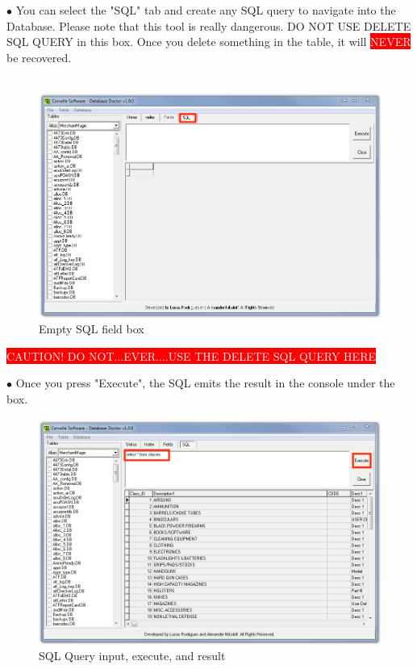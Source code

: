 \documentclass[a4paper, 11pt]{article}
\begin{document}
\vspace*{\fill}
$\bullet$ You can select the "SQL" tab and create any SQL query to navigate into the Database. Please note that this tool is really dangerous. DO NOT USE DELETE SQL QUERY in this box. Once you delete something in the table, it will \colorbox{Red}{\textcolor{White}{NEVER}} be recovered.\\ \\
\begin{figure}[h]
    \centering
     \includegraphics[width=\textwidth]{capture 43}
    \caption{Empty SQL field box}
\end{figure}
\vspace*{\fill}
\colorbox{Red}{\textcolor{White}{CAUTION! DO NOT...EVER....USE THE DELETE SQL QUERY HERE}} 
\pagebreak

\vspace*{\fill}
$\bullet$ Once you press "Execute", the SQL emits the result in the console under the box.
\begin{figure}[h]
    \centering
     \includegraphics[width=\textwidth]{capture 44}
    \caption{SQL Query input, execute, and result}
\end{figure}
\vspace*{\fill}
\pagebreak
\end{document}

